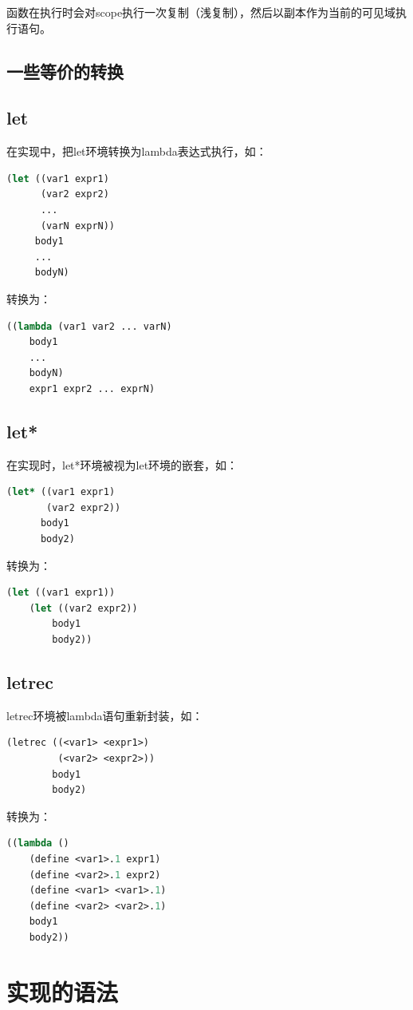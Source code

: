 \documentclass[11pt, a4paper]{article}
\begin{document}
			函数在执行时会对scope执行一次复制（浅复制），然后以副本作为当前的可见域执行语句。
		\subsection{一些等价的转换}
			\subsection{let}
				在实现中，把let环境转换为lambda表达式执行，如：
\begin{lstlisting}[language=lisp]
(let ((var1 expr1)
      (var2 expr2)
      ...
      (varN exprN))
     body1
     ...
     bodyN)
\end{lstlisting}
转换为：
\begin{lstlisting}[language=lisp]
((lambda (var1 var2 ... varN)
	body1
	...
	bodyN)
	expr1 expr2 ... exprN)
\end{lstlisting}

			\subsection{let*}
				在实现时，let*环境被视为let环境的嵌套，如：
\begin{lstlisting}[language=lisp]
(let* ((var1 expr1)
       (var2 expr2))
      body1
      body2)
\end{lstlisting}
转换为：
\begin{lstlisting}[language=lisp]
(let ((var1 expr1))
	(let ((var2 expr2))
		body1
		body2))
\end{lstlisting}

			\subsection{letrec}
				letrec环境被lambda语句重新封装，如：
\begin{lstlisting}[language=lisp]
(letrec ((<var1> <expr1>)
         (<var2> <expr2>))
		body1
		body2)
\end{lstlisting}
转换为：
\begin{lstlisting}[language=lisp]
((lambda ()
	(define <var1>.1 expr1)
	(define <var2>.1 expr2)
	(define <var1> <var1>.1)
	(define <var2> <var2>.1)
	body1
	body2))
\end{lstlisting}

	\section{实现的语法}
\end{document}
